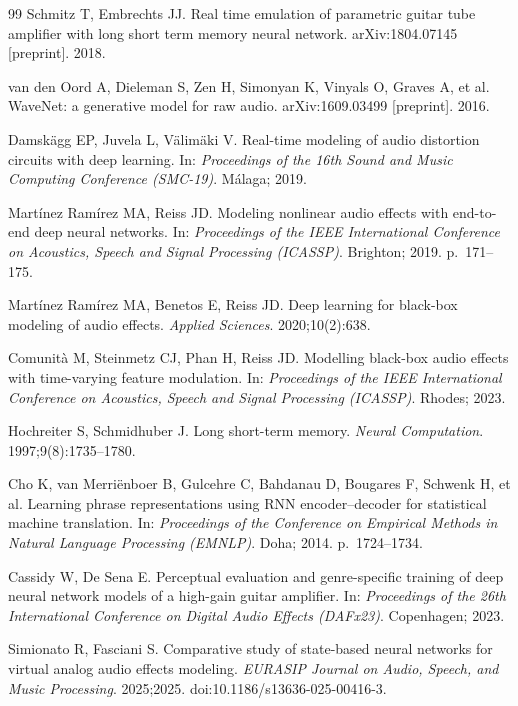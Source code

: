 \documentclass[ENG]{TFUOC}%
\begin{document}
\begin{thebibliography}{99}
 Schmitz T, Embrechts JJ. Real time emulation of parametric guitar tube amplifier with long short term memory neural network. arXiv:1804.07145 [preprint]. 2018.

 van den Oord A, Dieleman S, Zen H, Simonyan K, Vinyals O, Graves A, et al. WaveNet: a generative model for raw audio. arXiv:1609.03499 [preprint]. 2016.

 Damskägg EP, Juvela L, Välimäki V. Real-time modeling of audio distortion circuits with deep learning. In: \emph{Proceedings of the 16th Sound and Music Computing Conference (SMC-19)}. Málaga; 2019.

 Martínez Ramírez MA, Reiss JD. Modeling nonlinear audio effects with end-to-end deep neural networks. In: \emph{Proceedings of the IEEE International Conference on Acoustics, Speech and Signal Processing (ICASSP)}. Brighton; 2019. p.~171--175.

 Martínez Ramírez MA, Benetos E, Reiss JD. Deep learning for black-box modeling of audio effects. \emph{Applied Sciences}. 2020;10(2):638.

 Comunità M, Steinmetz CJ, Phan H, Reiss JD. Modelling black-box audio effects with time-varying feature modulation. In: \emph{Proceedings of the IEEE International Conference on Acoustics, Speech and Signal Processing (ICASSP)}. Rhodes; 2023.

 Hochreiter S, Schmidhuber J. Long short-term memory. \emph{Neural Computation}. 1997;9(8):1735--1780.

 Cho K, van Merriënboer B, Gulcehre C, Bahdanau D, Bougares F, Schwenk H, et al. Learning phrase representations using RNN encoder--decoder for statistical machine translation. In: \emph{Proceedings of the Conference on Empirical Methods in Natural Language Processing (EMNLP)}. Doha; 2014. p.~1724--1734.

 Cassidy W, De Sena E. Perceptual evaluation and genre-specific training of deep neural network models of a high-gain guitar amplifier. In: \emph{Proceedings of the 26th International Conference on Digital Audio Effects (DAFx23)}. Copenhagen; 2023.

 Simionato R, Fasciani S. Comparative study of state-based neural networks for virtual analog audio effects modeling. \emph{EURASIP Journal on Audio, Speech, and Music Processing}. 2025;2025. doi:10.1186/s13636-025-00416-3.


\end{thebibliography}
\end{document}
